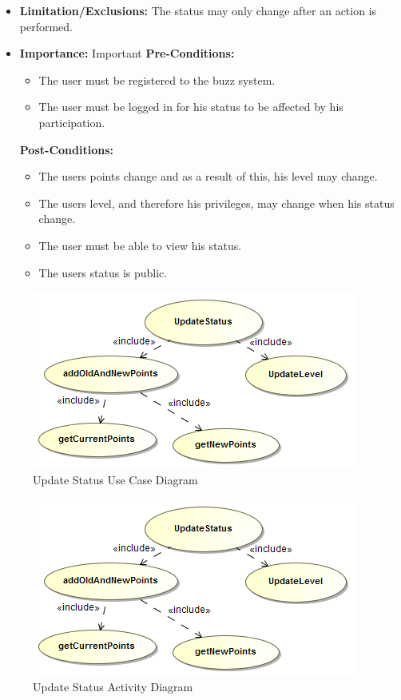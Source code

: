 \documentclass[11pt]{article}
\begin{document}
\begin{enumerate}
\begin{itemize}
	\item  \textbf{Limitation/Exclusions: } The status may only change after an action is performed.

\item \textbf{Importance:} Important \newline
\textbf{Pre-Conditions: }
	\begin{itemize}
		\item The user must be registered to the buzz system.
		\item The user must be logged in for his status to be affected by his participation.

	\end{itemize}

\textbf{Post-Conditions: }
	\begin{itemize}
		\item The users points change and as a result of this, his level may change.
		\item The users level, and therefore his privileges, may change when his status change.
		\item The user must be able to view his status.
		\item The users status is public.
	\end{itemize}
\end{itemize}

\graphicspath{ {../Diagrams/Maret/usecase/} }	
	\begin{figure}[H]	
    	\includegraphics[scale=0.5]{UpdateStatus.png}
    	\caption{Update Status Use Case Diagram}
	\end{figure}
	
\graphicspath{ {../Diagrams/Maret/activity/} }
	\begin{figure}[H]	
    	\includegraphics[scale=0.5]{UpdateStatus.png}
    	\caption{Update Status Activity Diagram}
	\end{figure}
	

\end{enumerate}
\end{document}
